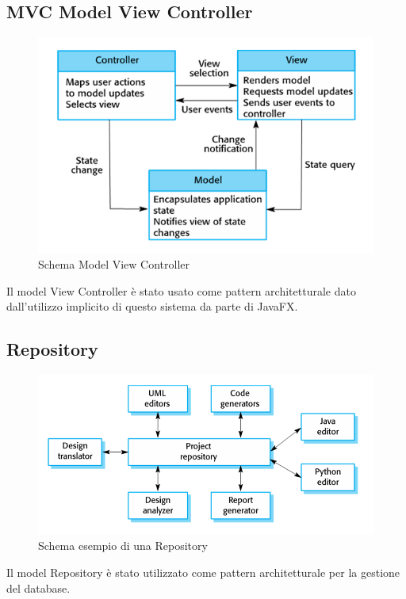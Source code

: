 \documentclass[12pt, a4paper]{article}
\begin{document}
\subsection{MVC Model View Controller}
\begin{figure}[H]
\centering
\includegraphics[width=\linewidth]{MVC.PNG}
\caption{Schema Model View Controller}
\end{figure}
Il model View Controller è stato usato come pattern architetturale dato dall'utilizzo implicito di questo sistema da parte di JavaFX.

\subsection{Repository}
\begin{figure}[H]
\centering
\includegraphics[width=\linewidth]{Repository.PNG}
\caption{Schema esempio di una Repository}
\end{figure}
Il model Repository è stato utilizzato come pattern architetturale per la gestione del database. 
\end{document}
